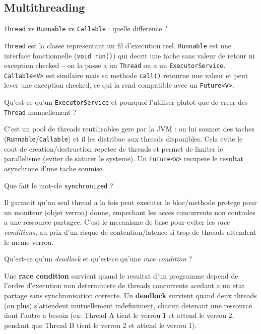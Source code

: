 \documentclass[11pt,a4paper]{article}
\begin{document}
\subsection{Multithreading}

\begin{question} \texttt{Thread} vs \texttt{Runnable} vs \texttt{Callable} : quelle difference ?
\end{question}
\begin{reponse}
\texttt{Thread} est la classe representant un fil d'execution reel. \texttt{Runnable} est une interface fonctionnelle (\texttt{void run()}) qui decrit une tache sans valeur de retour ni exception checked -- on la passe a un \texttt{Thread} ou a un \texttt{ExecutorService}. \texttt{Callable<V>} est similaire mais sa methode \texttt{call()} retourne une valeur et peut lever une exception checked, ce qui la rend compatible avec un \texttt{Future<V>}.
\end{reponse}

\begin{question} Qu'est-ce qu'un \texttt{ExecutorService} et pourquoi l'utiliser plutot que de creer des \texttt{Thread} manuellement ?
\end{question}
\begin{reponse}
C'est un pool de threads reutilisables gere par la JVM : on lui soumet des taches (\texttt{Runnable}/\texttt{Callable}) et il les distribue aux threads disponibles. Cela evite le cout de creation/destruction repetee de threads et permet de limiter le parallelisme (eviter de saturer le systeme). Un \texttt{Future<V>} recupere le resultat asynchrone d'une tache soumise.
\end{reponse}

\begin{question} Que fait le mot-cle \texttt{synchronized} ?
\end{question}
\begin{reponse}
Il garantit qu'un seul thread a la fois peut executer le bloc/methode protege pour un moniteur (objet verrou) donne, empechant les acces concurrents non controles a une ressource partagee. C'est le mecanisme de base pour eviter les \emph{race conditions}, au prix d'un risque de contention/latence si trop de threads attendent le meme verrou.
\end{reponse}

\begin{question} Qu'est-ce qu'un \emph{deadlock} et qu'est-ce qu'une \emph{race condition} ?
\end{question}
\begin{reponse}
Une \textbf{race condition} survient quand le resultat d'un programme depend de l'ordre d'execution non deterministe de threads concurrents acedant a un etat partage sans synchronisation correcte. Un \textbf{deadlock} survient quand deux threads (ou plus) s'attendent mutuellement indefiniment, chacun detenant une ressource dont l'autre a besoin (ex: Thread A tient le verrou 1 et attend le verrou 2, pendant que Thread B tient le verrou 2 et attend le verrou 1).
\end{reponse}
\end{document}
